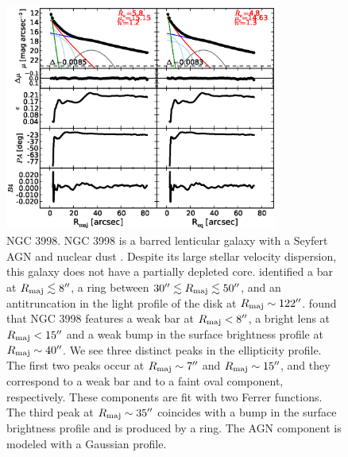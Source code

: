 \documentclass[preprint2]{emulateapj}
\newcommand{\fitfigurewidth}{0.8\textwidth}
\begin{document}
  \begin{figure}[h]
  \begin{center}
  \includegraphics[width=\fitfigurewidth]{images/n3998_1Dfit.eps}
  \caption{NGC 3998.
  NGC 3998 is a barred lenticular galaxy with a Seyfert AGN and nuclear dust \citep{knapp1996n3998}.
  Despite its large stellar velocity dispersion, this galaxy does not have a partially depleted core. 
  \cite{gutierrez2011} identified a bar at $R_{\rm maj} \lesssim 8''$, a ring between $30'' \lesssim R_{\rm maj} \lesssim 50''$, and  
  an antitruncation in the light profile of the disk at $R_{\rm maj} \sim 122''$.
  \cite{laurikainen2010} found that NGC 3998 features a weak bar at $R_{\rm maj} < 8''$,
  a bright lens at $R_{\rm maj} < 15''$ and a weak bump in the surface brightness profile at $R_{\rm maj} \sim 40''$.
  We see three distinct peaks in the ellipticity profile.
  The first two peaks occur at $R_{\rm maj} \sim 7''$ and $R_{\rm maj} \sim 15''$, and they correspond to a weak bar and to a faint 
  oval component, respectively.
  These components are fit with two Ferrer functions.
  The third peak at $R_{\rm maj} \sim 35''$ coincides with a bump in the surface brightness profile and is produced by a ring.
  The AGN component is modeled with a Gaussian profile.
  }
  \end{center}
  \end{figure}
\end{document}
